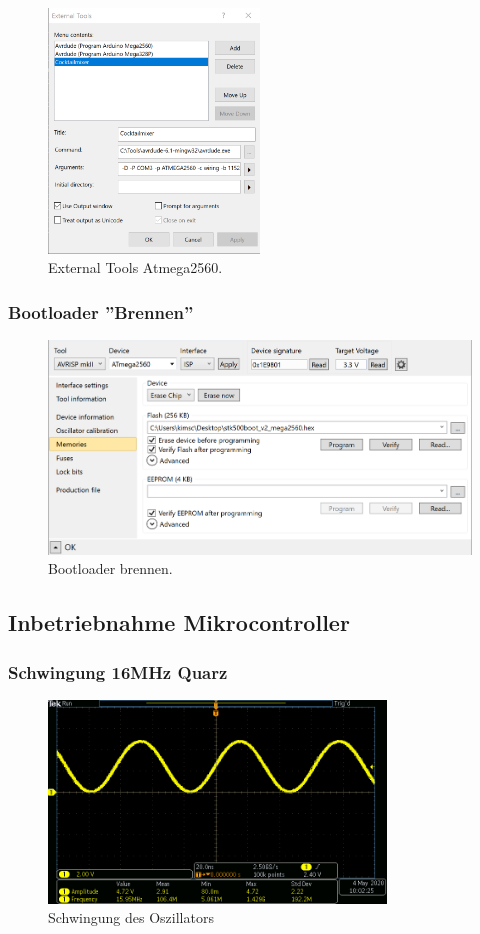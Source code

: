\begin{figure}[H]
	\centering
	\includegraphics[width=0.5\textwidth]{graphics/AtmelStudio_External_Tools}
	\caption{External Tools Atmega2560.}
	\label{fig:AtmelStudio_External_Tools}
\end{figure}

\subsubsection{Bootloader ''Brennen''}

\begin{figure}[H]
	\centering
	\includegraphics[width=\textwidth]{graphics/AtmelStudio_Program_Bootloader}
	\caption{Bootloader brennen.}
	\label{fig:AtmelStudio_Program_Bootloader}
\end{figure}

\subsection{Inbetriebnahme Mikrocontroller}

\subsubsection{Schwingung 16MHz Quarz}

\begin{figure}[H]
\center
\includegraphics[width = 0.8\textwidth]{graphics/Crystal_Swing}
\caption{Schwingung des Oszillators}
\label{fig:Crystal_Swing}
\end{figure}